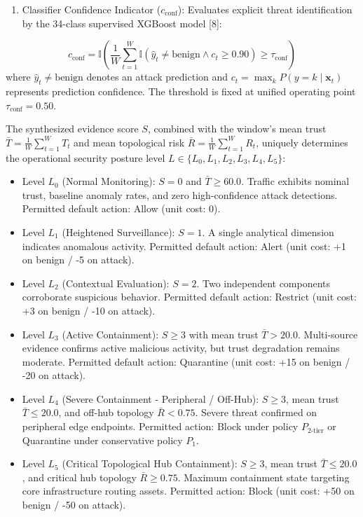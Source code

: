 \documentclass[journal,10pt,onecolumn]{IEEEtran}
\begin{document}
\begin{enumerate}
  \item Classifier Confidence Indicator ($c_{\text{conf}}$): Evaluates explicit threat identification by the 34-class supervised XGBoost model [8]:
\end{enumerate}
$$c_{\text{conf}} = \mathbb{I}\left(\frac{1}{W} \sum_{t=1}^W \mathbb{I}(\hat{y}_t \ne \text{benign} \land c_t \ge 0.90) \ge \tau_{\text{conf}}\right)$$
where $\hat{y}_t \ne \text{benign}$ denotes an attack prediction and $c_t = \max_k P(y=k \mid \mathbf{x}_t)$ represents prediction confidence. The threshold is fixed at unified operating point $\tau_{\text{conf}} = 0.50$.

The synthesized evidence score $S$, combined with the window's mean trust $\bar{T} = \frac{1}{W} \sum_{t=1}^W T_t$ and mean topological risk $\bar{R} = \frac{1}{W} \sum_{t=1}^W R_t$, uniquely determines the operational security posture level $L \in \{L_0, L_1, L_2, L_3, L_4, L_5\}$:
\begin{itemize}
  \item Level $L_0$ (Normal Monitoring): $S = 0$ and $\bar{T} \ge 60.0$. Traffic exhibits nominal trust, baseline anomaly rates, and zero high-confidence attack detections. Permitted default action: Allow (unit cost: 0).
  \item Level $L_1$ (Heightened Surveillance): $S = 1$. A single analytical dimension indicates anomalous activity. Permitted default action: Alert (unit cost: +1 on benign / -5 on attack).
  \item Level $L_2$ (Contextual Evaluation): $S = 2$. Two independent components corroborate suspicious behavior. Permitted default action: Restrict (unit cost: +3 on benign / -10 on attack).
  \item Level $L_3$ (Active Containment): $S \ge 3$ with mean trust $\bar{T} > 20.0$. Multi-source evidence confirms active malicious activity, but trust degradation remains moderate. Permitted default action: Quarantine (unit cost: +15 on benign / -20 on attack).
  \item Level $L_4$ (Severe Containment - Peripheral / Off-Hub): $S \ge 3$, mean trust $\bar{T} \le 20.0$, and off-hub topology $\bar{R} < 0.75$. Severe threat confirmed on peripheral edge endpoints. Permitted action: Block under policy $P_{2\text{-tier}}$ or Quarantine under conservative policy $P_1$.
  \item Level $L_5$ (Critical Topological Hub Containment): $S \ge 3$, mean trust $\bar{T} \le 20.0$, and critical hub topology $\bar{R} \ge 0.75$. Maximum containment state targeting core infrastructure routing assets. Permitted action: Block (unit cost: +50 on benign / -50 on attack).
\end{itemize}
\end{document}
